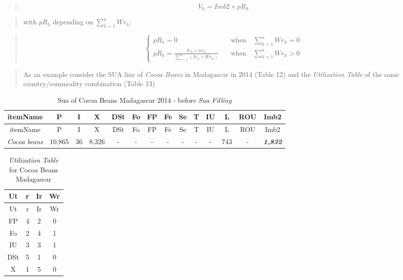 \documentclass[]{article}
\begin{document}
\begin{quote}
\begin{equation}
\label{eq:inverseRank}
V_{h} = Imb2 \times pR_{h}
\end{equation}
\end{quote}

\begin{quote}
with \(pR_{h}\) depending on \(\sum \limits_{h=1}^n Wr_{h}\):
\end{quote}

\begin{quote}
\begin{equation}
\label{eq:weightRank}
\begin{cases}
pR_{h} = 0     & \quad \text{when} \quad \sum \limits_{h=1}^n Wr_{h} = 0\\
pR_{h} = \frac{Ir_{h}\times we_{h}}{\sum \limits_{i=1}^n\left(Ir_{h}\times Wr_{h}\right)}     & \quad \text{when} \quad \sum \limits_{h=1}^n Wr_{h} > 0 
\end{cases}
\end{equation}
\end{quote}

\begin{quote}
\end{quote}

\begin{quote}
As an example consider the SUA line of \emph{Cocoa Beans} in Madagascar
in 2014 (Table 12) and the \emph{Utilization Table} of the same
country/commodity combination (Table 13)
\end{quote}

\begin{longtable}[]{@{}cccccccccccccc@{}}
\caption{Sua of Cocoa Beans Madagascar 2014 - before \emph{Sua
Filling}}\tabularnewline
\toprule
itemName & P & I & X & DSt & Fo & FP & Fe & Se & T & IU & L & ROU &
Imb2\tabularnewline
\midrule
\endfirsthead
\toprule
itemName & P & I & X & DSt & Fo & FP & Fe & Se & T & IU & L & ROU &
Imb2\tabularnewline
\midrule
\endhead
\emph{Cocoa beans} & 10,865 & 36 & 8,326 & - & - & - & - & - & - & - &
743 & - & \textbf{\emph{1,832}}\tabularnewline
\bottomrule
\end{longtable}

\begin{longtable}[]{@{}cccc@{}}
\caption{\emph{Utilization Table} for Cocoa Beans
Madagascar}\tabularnewline
\toprule
Ut & r & Ir & Wr\tabularnewline
\midrule
\endfirsthead
\toprule
Ut & r & Ir & Wr\tabularnewline
\midrule
\endhead
FP & 4 & 2 & 0\tabularnewline
Fo & 2 & 4 & 1\tabularnewline
IU & 3 & 3 & 1\tabularnewline
DSt & 5 & 1 & 0\tabularnewline
X & 1 & 5 & 0\tabularnewline
\bottomrule
\end{longtable}
\end{document}
